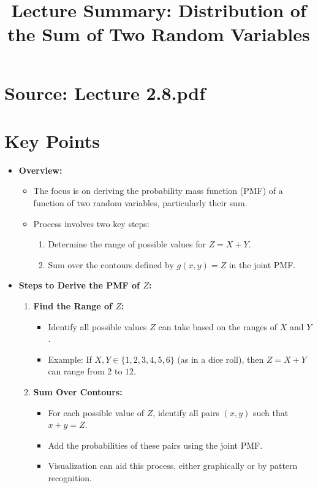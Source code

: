 \documentclass{article}
\title{Lecture Summary: Distribution of the Sum of Two Random Variables}
\author{}
\date{}
\begin{document}
\maketitle

\section*{Source: Lecture 2.8.pdf}

\section*{Key Points}

\begin{itemize}
  \item \textbf{Overview:}
    \begin{itemize}
      \item The focus is on deriving the probability mass function (PMF) of a function of two random variables, particularly their sum.
      \item Process involves two key steps:
        \begin{enumerate}
          \item Determine the range of possible values for $Z = X + Y$.
          \item Sum over the contours defined by $g(x, y) = Z$ in the joint PMF.
        \end{enumerate}
    \end{itemize}

  \item \textbf{Steps to Derive the PMF of $Z$:}
    \begin{enumerate}
      \item \textbf{Find the Range of $Z$:}
        \begin{itemize}
          \item Identify all possible values $Z$ can take based on the ranges of $X$ and $Y$.
          \item Example: If $X, Y \in \{1, 2, 3, 4, 5, 6\}$ (as in a dice roll), then $Z = X + Y$ can range from $2$ to $12$.
        \end{itemize}
      \item \textbf{Sum Over Contours:}
        \begin{itemize}
          \item For each possible value of $Z$, identify all pairs $(x, y)$ such that $x + y = Z$.
          \item Add the probabilities of these pairs using the joint PMF.
          \item Visualization can aid this process, either graphically or by pattern recognition.
        \end{itemize}
    \end{enumerate}


\end{itemize}
\end{document}
